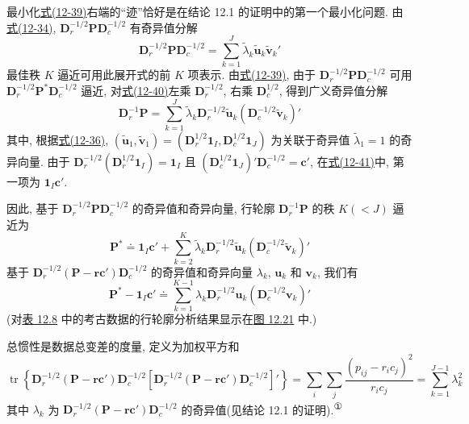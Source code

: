 
最小化\hyperref[eq:12-39]{式(12-39)}右端的“迹”恰好是在结论 12.1 的证明中的第一个最小化问题. 由\hyperref[eq:12-34]{式(12-34)}, $\mathbf{D}_r^{-1/2}\mathbf{P}\mathbf{D}_c^{-1/2}$ 有奇异值分解
\label{eq:12-40}
\begin{equation}
\mathbf{D}_r^{-1/2}\mathbf{P}\mathbf{D}_c^{-1/2}=\sum_{k=1}^{J}\tilde{\lambda}_k\tilde{\mathbf{u}}_k\tilde{\mathbf{v}}_k'
\tag{12-40}
\end{equation}
最佳秩 $K$ 逼近可用此展开式的前 $K$ 项表示. 由\hyperref[eq:12-39]{式(12-39)}, 由于 $\mathbf{D}_r^{-1/2}\mathbf{P}\mathbf{D}_c^{-1/2}$ 可用 $\mathbf{D}_r^{-1/2}\mathbf{P}^*\mathbf{D}_c^{-1/2}$ 逼近, 对\hyperref[eq:12-40]{式(12-40)}左乘 $\mathbf{D}_r^{-1/2}$, 右乘 $\mathbf{D}_c^{1/2}$, 得到广义奇异值分解
\label{eq:12-41}
\begin{equation}
\mathbf{D}_r^{-1}\mathbf{P}=\sum_{k=1}^{J}\tilde{\lambda}_k\mathbf{D}_r^{-1/2}\tilde{\mathbf{u}}_k
(\mathbf{D}_c^{-1/2}\tilde{\mathbf{v}}_k)'
\tag{12-41}
\end{equation}
其中, 根据\hyperref[eq:12-36]{式(12-36)}, $(\tilde{\mathbf{u}}_1,\tilde{\mathbf{v}}_1)=(\mathbf{D}_r^{1/2}\mathbf{1}_I,\mathbf{D}_c^{1/2}\mathbf{1}_J)$ 为关联于奇异值 $\tilde{\lambda}_1=1$ 的奇异向量. 由于 $\mathbf{D}_r^{-1/2}(\mathbf{D}_r^{1/2}\mathbf{1}_I)=\mathbf{1}_I$ 且 $(\mathbf{D}_c^{1/2}\mathbf{1}_J)'\mathbf{D}_c^{-1/2}=\mathbf{c}'$, 在\hyperref[eq:12-41]{式(12-41)}中, 第一项为 $\mathbf{1}_I\mathbf{c}'$.

因此, 基于 $\mathbf{D}_r^{-1/2}\mathbf{P}\mathbf{D}_c^{-1/2}$ 的奇异值和奇异向量, 行轮廓 $\mathbf{D}_r^{-1}\mathbf{P}$ 的秩 $K(<J)$ 逼近为
\label{eq:12-42}
\begin{equation}
\mathbf{P}^*\doteq\mathbf{1}_I\mathbf{c}'+\sum_{k=2}^{K}\tilde{\lambda}_k\mathbf{D}_r^{-1/2}\tilde{\mathbf{u}}_k
(\mathbf{D}_c^{-1/2}\tilde{\mathbf{v}}_k)'
\tag{12-42}
\end{equation}
基于 $\mathbf{D}_r^{-1/2}(\mathbf{P}-\mathbf{r}\mathbf{c}')\mathbf{D}_c^{-1/2}$ 的奇异值和奇异向量 $\lambda_k$, $\mathbf{u}_k$ 和 $\mathbf{v}_k$, 我们有
\[
\mathbf{P}^*-\mathbf{1}_I\mathbf{c}'\doteq\sum_{k=1}^{K-1}\lambda_k\mathbf{D}_r^{-1/2}\mathbf{u}_k
(\mathbf{D}_c^{-1/2}\mathbf{v}_k)'
\]
(对\hyperref[tab:12.8]{表 12.8} 中的考古数据的行轮廓分析结果显示在\hyperref[fig:12.21]{图 12.21} 中.)


总惯性是数据总变差的度量, 定义为加权平方和
\label{eq:12-43}
\begin{equation}
\operatorname{tr}\left\{\mathbf{D}_r^{-1/2}(\mathbf{P}-\mathbf{r}\mathbf{c}')\mathbf{D}_c^{-1/2}
\left[\mathbf{D}_r^{-1/2}(\mathbf{P}-\mathbf{r}\mathbf{c}')\mathbf{D}_c^{-1/2}\right]'\right\}
=\sum_{i}\sum_{j}\frac{(p_{ij}-r_ic_j)^2}{r_ic_j}=\sum_{k=1}^{J-1}\lambda_k^2
\tag{12-43}
\end{equation}
其中 $\lambda_k$ 为 $\mathbf{D}_r^{-1/2}(\mathbf{P}-\mathbf{r}\mathbf{c}')\mathbf{D}_c^{-1/2}$ 的奇异值(见结论 12.1 的证明).\textsuperscript{①}

